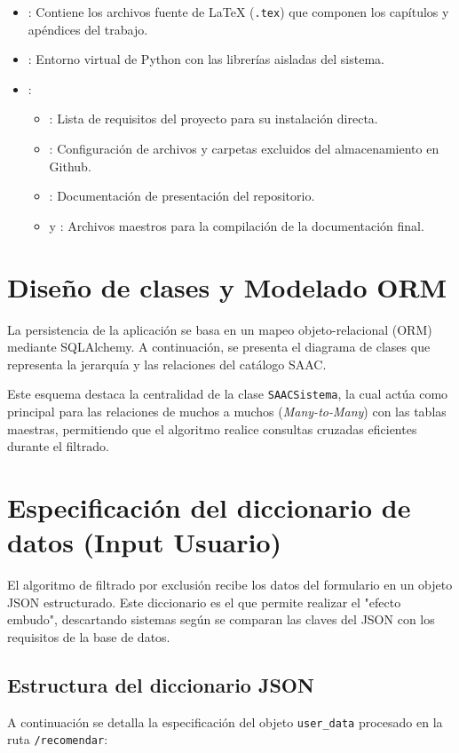 \begin{itemize}
    	\item {}: Contiene los archivos fuente de LaTeX (\texttt{.tex}) que componen los capítulos y apéndices del trabajo.
   	\item {}: Entorno virtual de Python con las librerías aisladas del sistema.
    	\item {}:
    	\begin{itemize}
        		\item {}: Lista de requisitos del proyecto para su instalación directa.
        		\item {}: Configuración de archivos y carpetas excluidos del almacenamiento en Github.
        		\item {}: Documentación de presentación del repositorio.
        		\item {} y : Archivos maestros para la compilación de la documentación final.
   	 \end{itemize}
\end{itemize}

\section{Diseño de clases y Modelado ORM}
La persistencia de la aplicación se basa en un mapeo objeto-relacional (ORM) mediante SQLAlchemy. A continuación, se presenta el diagrama de clases que representa la jerarquía y las relaciones del catálogo SAAC.


Este esquema destaca la centralidad de la clase \texttt{SAACSistema}, la cual actúa como principal para las relaciones de muchos a muchos (\textit{Many-to-Many}) con las tablas maestras, permitiendo que el algoritmo realice consultas cruzadas eficientes durante el filtrado.

\section{Especificación del diccionario de datos (Input Usuario)}
El algoritmo de filtrado por exclusión recibe los datos del formulario en un objeto JSON estructurado. Este diccionario es el que permite realizar el "efecto embudo", descartando sistemas según se comparan las claves del JSON con los requisitos de la base de datos.

\subsection{Estructura del diccionario JSON}
A continuación se detalla la especificación del objeto \texttt{user\_data} procesado en la ruta \texttt{/recomendar}:

